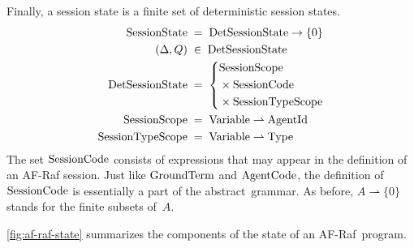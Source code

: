 \documentclass[a4paper,12pt,oneside,fleqn]{book} %
\newcommand{\pmap}{\rightharpoonup}
\begin{document}
Finally, a session state is a finite set of deterministic session states.
\begin{align}
{\rm SessionState} &\;=\; {\rm DetSessionState}\to\{0\}
\\
(\Delta,Q) &\;\in\;{\rm DetSessionState}
\\
{\rm DetSessionState} &\;=\;
  \left\{
  \begin{aligned}
  &{\rm SessionScope}
    \\&\times{\rm SessionCode}
    \\&\times{\rm SessionTypeScope}
  \end{aligned}
  \right.
\\
{\rm SessionScope} &\;=\; {\rm Variable}\pmap{\rm AgentId}
\\
{\rm SessionTypeScope} &\;=\; {\rm Variable}\pmap{\rm Type}
\end{align}
The set ${\rm SessionCode}$ consists of expressions that may appear in the
definition of an AF-Raf session. Just like ${\rm GroundTerm}$ and ${\rm
AgentCode}$, the definition of ${\rm SessionCode}$ is essentially a part of
the abstract~grammar.  As before, $A\pmap\{0\}$ stands for the finite
subsets of~$A$.

\autoref{fig:af-raf-state} summarizes the components of the state of an
AF-Raf~program.
\end{document}
